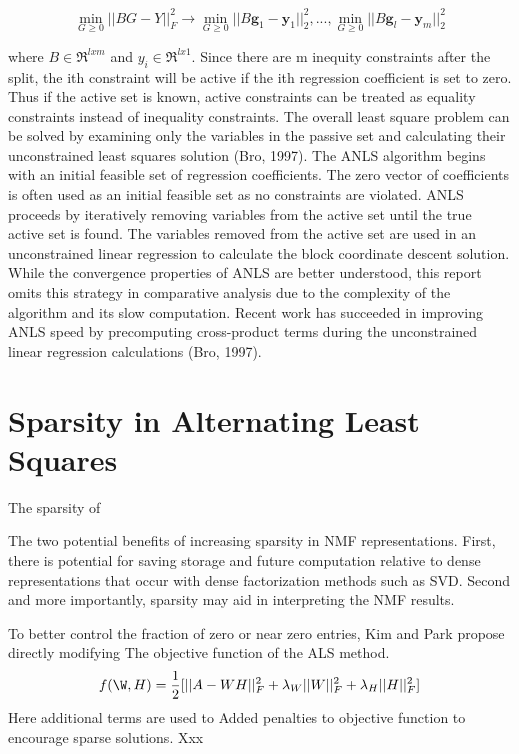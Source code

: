 \documentclass[final,leqno,onefignum,onetabnum]{siamltex1213}
\begin{document}
\begin{equation}
    \min_{G \ge 0} || BG-Y ||^{2}_{F} \to  \min_{G \ge 0} || B\textbf{g}_1-\textbf{y}_1 ||^{2}_{2}, ...,   \min_{G \ge 0} || B\textbf{g}_l-\textbf{y}_m ||^{2}_{2}
\end{equation}

where $ B \in \Re^{lxm}$ and $y_i \in \Re^{lx1}$. Since there are m inequity constraints after the split, the ith constraint will be active if the ith regression coefficient is set to zero. Thus if the active set is known, active constraints can be treated as equality constraints instead of inequality constraints. The overall least square problem can be solved by examining only the variables in the passive set and calculating their unconstrained least squares solution (Bro, 1997). The ANLS algorithm begins with an initial feasible set of regression coefficients. The zero vector of coefficients is often used as an initial feasible set as no constraints are violated. ANLS proceeds by iteratively removing variables from the active set until the true active set is found. The variables removed from the active set are used in an unconstrained linear regression to calculate the block coordinate descent solution. While the convergence properties of ANLS are better understood, this report omits this strategy in comparative analysis due to the complexity of the algorithm and its slow computation. Recent work has succeeded in improving ANLS speed by precomputing cross-product terms during the unconstrained linear regression calculations (Bro, 1997). 

\section{Sparsity in Alternating Least Squares} The sparsity of 

The two potential benefits of increasing sparsity in NMF representations. First, there is potential for saving storage and future computation relative to dense representations that occur with dense factorization methods such as SVD. Second and more importantly, sparsity may aid in interpreting the NMF results. 

To better control the fraction of zero or near zero entries, Kim and Park propose directly modifying The objective function of the ALS method. 
\begin{equation}\label{ObjSpar}
 f( \W,H) = \frac{1}{2} [|| A - WH ||^{2}_{F} + \lambda_W || W ||^{2}_{F} + \lambda_H || H ||^{2}_{F} ]
\end{equation}
Here additional terms are used to 
Added penalties to objective function to encourage sparse solutions. Xxx
\end{document}

